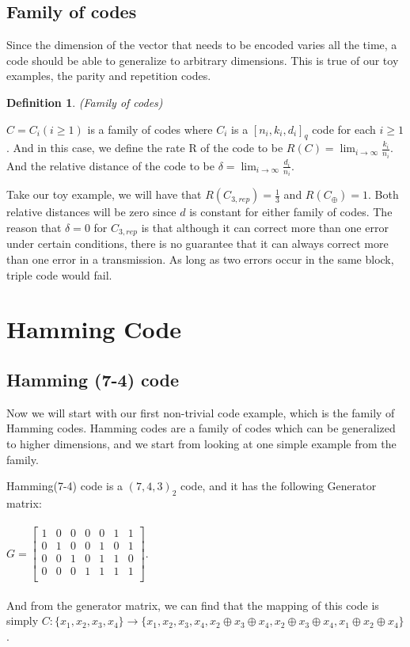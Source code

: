 \documentclass{article}
\newtheorem{Definition}{Definition}
\begin{document}
\subsection{Family of codes}
Since the dimension of the vector that needs to be encoded varies all the time, a code should be able to generalize to arbitrary dimensions. This is true of our toy examples, the parity and repetition codes.
\begin{Definition}(Family of codes)\end{Definition}
\noindent $C = C_i(i \ge 1)$ is a family of codes where $C_i$ is a $[n_i,k_i,d_i]_q$ code for each $i \ge 1$. And in this case, we define the rate R of the code to be $ R(C) = \lim_{i\to\infty} \frac{k_i}{n_i}$. And the relative distance of the code to be $\delta = \lim_{i\to\infty} \frac{d_i}{n_i}$.

Take our toy example, we will have that $R(C_{3,rep}) = \frac{1}{3}$ and $R(C_\oplus) = 1$. Both relative distances will be zero since $d$ is constant for either family of codes. The reason that $\delta = 0$ for $C_{3,rep}$ is that although it can correct more than one error under certain conditions, there is no guarantee that it can always correct more than one error in a transmission. As long as two errors occur in the same block, triple code would fail.

\section{Hamming Code}
\subsection{Hamming (7-4) code}
Now we will start with our first non-trivial code example, which is the family of Hamming codes. Hamming codes are a family of codes which can be generalized to higher dimensions, and we start from looking at one simple example from the family.

Hamming(7-4) code is a $(7,4,3)_2$ code, and it has the following Generator matrix: \\\\
$G = \begin{bmatrix}
	1 & 0 & 0 & 0 & 0 & 1 & 1 \\
	0 & 1 & 0 & 0 & 1 & 0 & 1 \\
	0 & 0 & 1 & 0 & 1 & 1 & 0  \\
	0 & 0 & 0 & 1 & 1 & 1 & 1 \\
    \end{bmatrix}$.\\\\
And from the generator matrix, we can find that the mapping of this code is simply 
$C: \{x_1, x_2, x_3,x_4\} \rightarrow \{x_1,x_2,x_3,x_4, x_2\oplus x_3\oplus x_4,x_2\oplus x_3\oplus x_4,x_1\oplus x_2\oplus x_4\}$.
\end{document}
